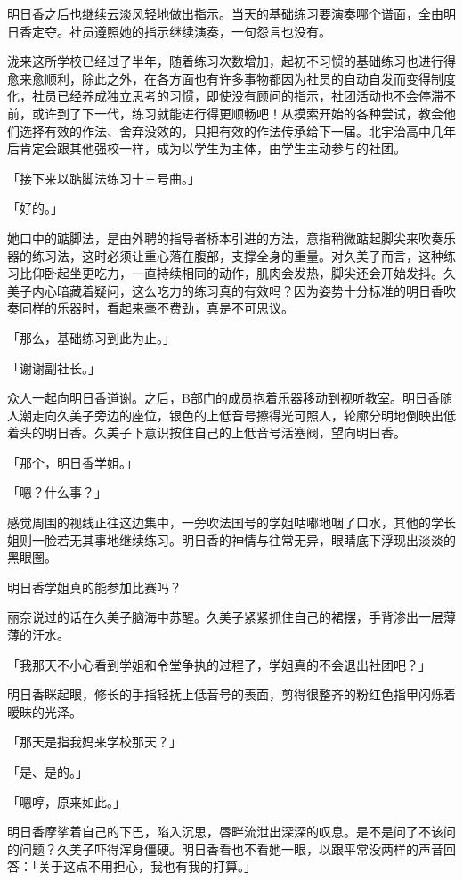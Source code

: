 \documentclass[UTF8]{ctexart}
\begin{document}
    明日香之后也继续云淡风轻地做出指示。当天的基础练习要演奏哪个谱面，全由明日香定夺。社员遵照她的指示继续演奏，一句怨言也没有。 

    泷来这所学校已经过了半年，随着练习次数增加，起初不习惯的基础练习也进行得愈来愈顺利，除此之外，在各方面也有许多事物都因为社员的自动自发而变得制度化，社员已经养成独立思考的习惯，即使没有顾问的指示，社团活动也不会停滞不前，或许到了下一代，练习就能进行得更顺畅吧！从摸索开始的各种尝试，教会他们选择有效的作法、舍弃没效的，只把有效的作法传承给下一届。北宇治高中几年后肯定会跟其他强校一样，成为以学生为主体，由学生主动参与的社团。 

    「接下来以踮脚法练习十三号曲。」 

    「好的。」 

    她口中的踮脚法，是由外聘的指导者桥本引进的方法，意指稍微踮起脚尖来吹奏乐器的练习法，这时必须让重心落在腹部，支撑全身的重量。对久美子而言，这种练习比仰卧起坐更吃力，一直持续相同的动作，肌肉会发热，脚尖还会开始发抖。久美子内心暗藏着疑问，这么吃力的练习真的有效吗？因为姿势十分标准的明日香吹奏同样的乐器时，看起来毫不费劲，真是不可思议。 

    「那么，基础练习到此为止。」 

    「谢谢副社长。」 

    众人一起向明日香道谢。之后，B部门的成员抱着乐器移动到视听教室。明日香随人潮走向久美子旁边的座位，银色的上低音号擦得光可照人，轮廓分明地倒映出低着头的明日香。久美子下意识按住自己的上低音号活塞阀，望向明日香。 

    「那个，明日香学姐。」 

    「嗯？什么事？」 

    感觉周围的视线正往这边集中，一旁吹法国号的学姐咕嘟地咽了口水，其他的学长姐则一脸若无其事地继续练习。明日香的神情与往常无异，眼睛底下浮现出淡淡的黑眼圈。 

    明日香学姐真的能参加比赛吗？ 

    丽奈说过的话在久美子脑海中苏醒。久美子紧紧抓住自己的裙摆，手背渗出一层薄薄的汗水。 

    「我那天不小心看到学姐和令堂争执的过程了，学姐真的不会退出社团吧？」 

    明日香眯起眼，修长的手指轻抚上低音号的表面，剪得很整齐的粉红色指甲闪烁着暧昧的光泽。 

    「那天是指我妈来学校那天？」 

    「是、是的。」 

    「嗯哼，原来如此。」 

    明日香摩挲着自己的下巴，陷入沉思，唇畔流泄出深深的叹息。是不是问了不该问的问题？久美子吓得浑身僵硬。明日香看也不看她一眼，以跟平常没两样的声音回答：「关于这点不用担心，我也有我的打算。」 
\end{document}
